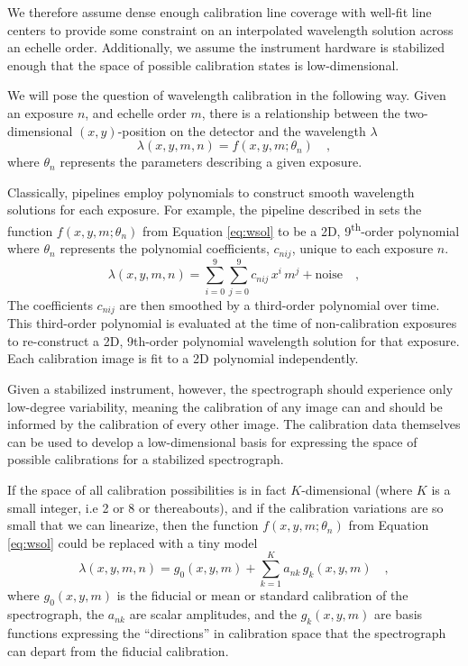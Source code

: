 \documentclass[twocolumn]{aastex63}
\begin{document}
We therefore assume dense enough calibration line coverage with well-fit line centers to provide some constraint on an interpolated wavelength solution across an echelle order.  Additionally, we assume the instrument hardware is stabilized enough that the space of possible calibration states is low-dimensional.

We will pose the question of wavelength calibration in the following way.  Given an exposure $n$, and echelle order $m$, there is a relationship between
the two-dimensional $(x,y)$-position on the detector and the
wavelength $\lambda$
\begin{equation}
\lambda(x,y,m,n) = f(x,y,m;\theta_{n})
\quad ,
\label{eq:wsol}
\end{equation}
where $\theta_{n}$ represents the parameters describing a given exposure.

Classically, pipelines employ polynomials to construct smooth wavelength solutions for each exposure.  For example, the pipeline described in \cite{petersburg2020} sets the function $f(x,y,m;\theta_{n})$ from Equation \ref{eq:wsol} to be a 2D, 9\textsuperscript{th}-order polynomial where $\theta_{n}$ represents the polynomial coefficients, $c_{nij}$, unique to each exposure $n$.
\begin{equation}
\lambda(x,y,m,n) = \sum_{i=0}^9\sum_{j=0}^9 c_{nij}\, x^i\,m^j + \mathrm{noise}
\quad ,
\label{eq:poly_wsol}
\end{equation}
The coefficients $c_{nij}$ are then smoothed by a third-order polynomial over time.  This third-order polynomial is evaluated at the time of non-calibration exposures to re-construct a 2D, 9th-order polynomial wavelength solution for that exposure.  Each calibration image is fit to a 2D polynomial independently.

Given a stabilized instrument, however, the spectrograph should experience only low-degree variability, meaning the calibration of any image can and should be informed by the calibration of every other image.  The calibration data themselves can be used to develop a low-dimensional basis for expressing the space of possible calibrations for a stabilized spectrograph.

If the space of all calibration possibilities is in fact $K$-dimensional (where $K$ is a small integer, i.e 2 or 8 or thereabouts), and if the calibration variations are so small that we can linearize, then the function $f(x,y,m;\theta_{n})$ from Equation \ref{eq:wsol} could be replaced with a tiny model
\begin{equation}
\lambda(x,y,m,n) = g_0(x,y,m) + \sum_{k=1}^K a_{nk}\,g_k(x,y,m)
\quad ,
\label{eq:excl_wsol}
\end{equation}
where
$g_0(x,y,m)$ is the fiducial or mean or standard calibration of the spectrograph,
the $a_{nk}$ are scalar amplitudes,
and the $g_k(x,y,m)$ are basis functions expressing the ``directions'' in calibration space that the spectrograph can depart from the fiducial calibration.
\end{document}
